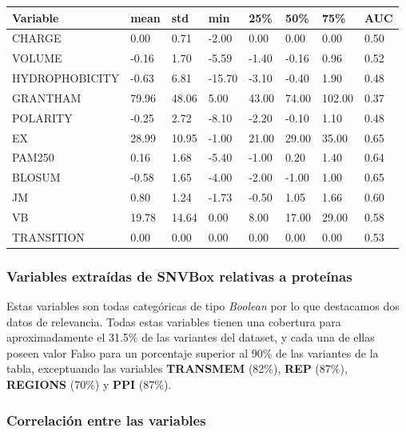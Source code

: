 \begin{table}[H]
\centering
\begin{tabular}{|l|l|l|l|l|l|l|l|}
\hline
Variable & mean   & std    & min    & 25\%  & 50\%   & 75\%   & AUC    \\ \hline
CHARGE            & 0.00  & 0.71   & -2.00  & 0.00  & 0.00   & 0.00   & 0.50   \\ \hline
VOLUME            & -0.16  & 1.70   & -5.59  & -1.40 & -0.16  & 0.96   & 0.52   \\ \hline
HYDROPHOBICITY    & -0.63  & 6.81   & -15.70 & -3.10 & -0.40  & 1.90   & 0.48  \\ \hline
GRANTHAM          & 79.96  & 48.06  & 5.00   & 43.00 & 74.00  & 102.00 & 0.37 \\ \hline
POLARITY          & -0.25  & 2.72   & -8.10  & -2.20 & -0.10  & 1.10   & 0.48   \\ \hline
EX                & 28.99  & 10.95  & -1.00  & 21.00 & 29.00  & 35.00  & 0.65  \\ \hline
PAM250            & 0.16   & 1.68   & -5.40  & -1.00 & 0.20   & 1.40   & 0.64   \\ \hline
BLOSUM            & -0.58  & 1.65   & -4.00  & -2.00 & -1.00  & 1.00   & 0.65   \\ \hline
JM                & 0.80   & 1.24   & -1.73  & -0.50 & 1.05   & 1.66   & 0.60   \\ \hline
VB                & 19.78  & 14.64  & 0.00   & 8.00  & 17.00  & 29.00  & 0.58  \\ \hline
TRANSITION        & 0.00   & 0.00   & 0.00   & 0.00  & 0.00   & 0.00   & 0.53   \\ \hline
\end{tabular}
\end{table}

\subsubsection{Variables extraídas de SNVBox relativas a proteínas}

Estas variables son todas categóricas de tipo \textit{Boolean} por lo que destacamos dos datos de relevancia. Todas estas variables tienen una cobertura para aproximadamente el 31.5\% de las variantes del dataset, y cada una de ellas poseen valor Falso para un porcentaje superior al 90\% de las variantes de la tabla, exceptuando las variables \textbf{TRANSMEM} (82\%), \textbf{REP} (87\%), \textbf{REGIONS} (70\%) y \textbf{PPI} (87\%).


\subsubsection{Correlación entre las variables}

